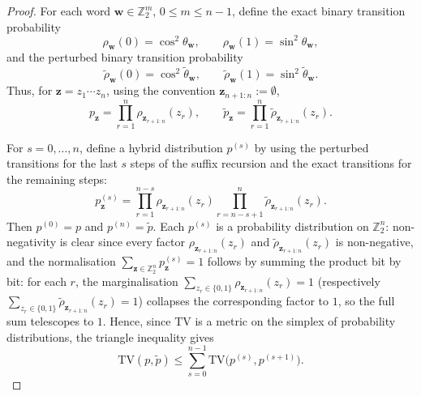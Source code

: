 \documentclass{article}
\numberwithin{equation}{section}
\begin{document}
\begin{proof}
For each word \(\mathbf w\in\mathbb Z_2^m\), \(0\le m\le n-1\), define
the exact binary transition probability
\[
\rho_{\mathbf w}(0)
=
\cos^2\theta_{\mathbf w},
\qquad
\rho_{\mathbf w}(1)
=
\sin^2\theta_{\mathbf w},
\]
and the perturbed binary transition probability
\[
\widetilde\rho_{\mathbf w}(0)
=
\cos^2\widetilde\theta_{\mathbf w},
\qquad
\widetilde\rho_{\mathbf w}(1)
=
\sin^2\widetilde\theta_{\mathbf w}.
\]
Thus, for \(\mathbf z=z_1\cdots z_n\), using the convention
\(\mathbf z_{n+1:n}:=\emptyset\),
\[
p_{\mathbf z}
=
\prod_{r=1}^{n}
\rho_{\mathbf z_{r+1:n}}(z_r),
\qquad
\widetilde p_{\mathbf z}
=
\prod_{r=1}^{n}
\widetilde\rho_{\mathbf z_{r+1:n}}(z_r).
\]

For \(s=0,\ldots,n\), define a hybrid distribution \(p^{(s)}\) by using
the perturbed transitions for the last \(s\) steps of the suffix
recursion and the exact transitions for the remaining steps:
\[
p^{(s)}_{\mathbf z}
=
\prod_{r=1}^{n-s}
\rho_{\mathbf z_{r+1:n}}(z_r)
\prod_{r=n-s+1}^{n}
\widetilde\rho_{\mathbf z_{r+1:n}}(z_r).
\]
Then \(p^{(0)}=p\) and \(p^{(n)}=\widetilde p\).
Each \(p^{(s)}\) is a probability distribution on \(\mathbb{Z}_2^n\): non-negativity
is clear since every factor \(\rho_{\mathbf{z}_{r+1:n}}(z_r)\) and
\(\widetilde\rho_{\mathbf{z}_{r+1:n}}(z_r)\) is non-negative, and the normalisation
\(\sum_{\mathbf{z}\in\mathbb{Z}_2^n}p^{(s)}_{\mathbf{z}}=1\) follows by summing
the product bit by bit: for each \(r\), the marginalisation
\(\sum_{z_r\in\{0,1\}}\rho_{\mathbf{z}_{r+1:n}}(z_r)=1\) (respectively
\(\sum_{z_r\in\{0,1\}}\widetilde\rho_{\mathbf{z}_{r+1:n}}(z_r)=1\)) collapses
the corresponding factor to \(1\), so the full sum telescopes to \(1\).
Hence, since \(\mathrm{TV}\) is a metric on the simplex of probability distributions,
the triangle inequality gives
\[
\mathrm{TV}(p,\widetilde p)
\le
\sum_{s=0}^{n-1}
\mathrm{TV}\bigl(p^{(s)},p^{(s+1)}\bigr).
\]


\end{proof}
\end{document}
